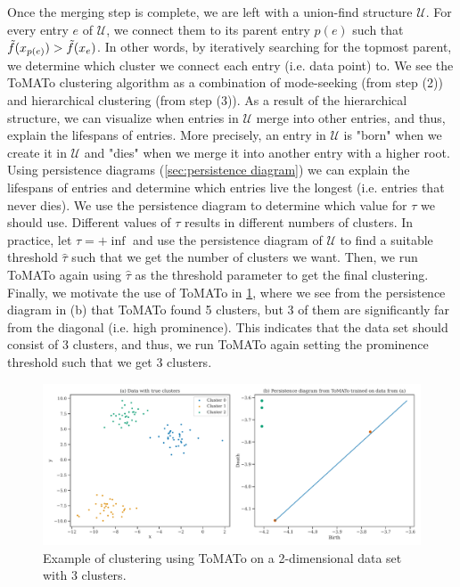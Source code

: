 Once the merging step is complete, we are left with a union-find structure $\mathcal{U}$. For every entry $e$ of $\mathcal{U}$, we connect them to its parent entry $p(e)$ such that $\Tilde{f}(x_{p(e)}) > \Tilde{f}(x_e)$. In other words, by iteratively searching for the topmost parent, we determine which cluster we connect each entry (i.e. data point) to. We see the ToMATo clustering algorithm as a combination of mode-seeking (from step (2)) and hierarchical clustering (from step (3)). As a result of the hierarchical structure, we can visualize when entries in $\mathcal{U}$ merge into other entries, and thus, explain the lifespans of entries. More precisely, an entry in $\mathcal{U}$ is "born" when we create it in $\mathcal{U}$ and "dies" when we merge it into another entry with a higher root. Using persistence diagrams (\cref{sec:persistence diagram}) we can explain the lifespans of entries and determine which entries live the longest (i.e. entries that never dies). We use the persistence diagram to determine which value for $\tau$ we should use. Different values of $\tau$ results in different numbers of clusters. In practice, let $\tau = +\inf$ and use the persistence diagram of $\mathcal{U}$ to find a suitable threshold $\hat{\tau}$ such that we get the number of clusters we want. Then, we run ToMATo again using $\hat{\tau}$ as the threshold parameter to get the final clustering. Finally, we motivate the use of ToMATo in \cref{fig:k-tomato-clustering-2d-example}, where we see from the persistence diagram in (b) that ToMATo found 5 clusters, but 3 of them are significantly far from the diagonal (i.e. high prominence). This indicates that the data set should consist of 3 clusters, and thus, we run ToMATo again setting the prominence threshold such that we get 3 clusters.
\begin{figure}[H]
    \centering
    \includegraphics[width=\textwidth]{thesis/figures/k-tomato-clustering-2d-example.pdf}
    \caption{Example of clustering using ToMATo on a 2-dimensional data set with 3 clusters.}
    \label{fig:k-tomato-clustering-2d-example}
\end{figure}

